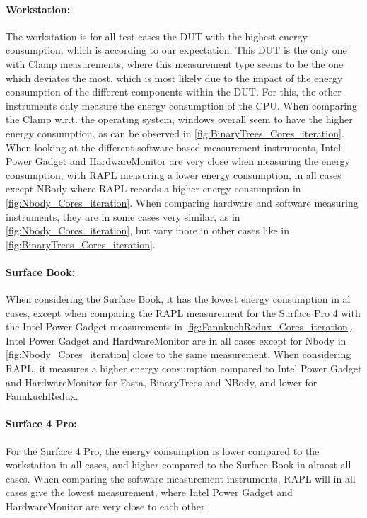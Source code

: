 \paragraph{Workstation:} The workstation is for all test cases the DUT with the highest energy consumption, which is according to our expectation. This DUT is the only one with Clamp measurements, where this measurement type seems to be the one which deviates the most, which is most likely due to the impact of the energy consumption of the different components within the DUT. For this, the other instruments only measure the energy consumption of the CPU. When comparing the Clamp w.r.t. the operating system, windows overall seem to have the higher energy consumption, as can be observed in \cref{fig:BinaryTrees_Cores_iteration}. When looking at the different software based measurement instruments, Intel Power Gadget and HardwareMonitor are very close when measuring the energy consumption, with RAPL measuring a lower energy consumption, in all cases except NBody where RAPL records a higher energy consumption in \cref{fig:Nbody_Cores_iteration}. When comparing hardware and software measuring instruments, they are in some cases very similar, as in \cref{fig:Nbody_Cores_iteration}, but vary more in other cases like in \cref{fig:BinaryTrees_Cores_iteration}.

\paragraph{Surface Book:} When considering the Surface Book, it has the lowest energy consumption in al cases, except when comparing the RAPL measurement for the Surface Pro 4 with the Intel Power Gadget measurements in \cref{fig:FannkuchRedux_Cores_iteration}. Intel Power Gadget and HardwareMonitor are in all cases except for Nbody in \cref{fig:Nbody_Cores_iteration} close to the same measurement. When considering RAPL, it measures a higher energy consumption compared to Intel Power Gadget and HardwareMonitor for Fasta, BinaryTrees and NBody, and lower for FannkuchRedux.

\paragraph{Surface 4 Pro:} For the Surface 4 Pro, the energy consumption is lower compared to the workstation in all cases, and higher compared to the Surface Book in almost all cases. When comparing the software measurement instruments, RAPL will in all cases give the lowest measurement, where Intel Power Gadget and HardwareMonitor are very close to each other.



